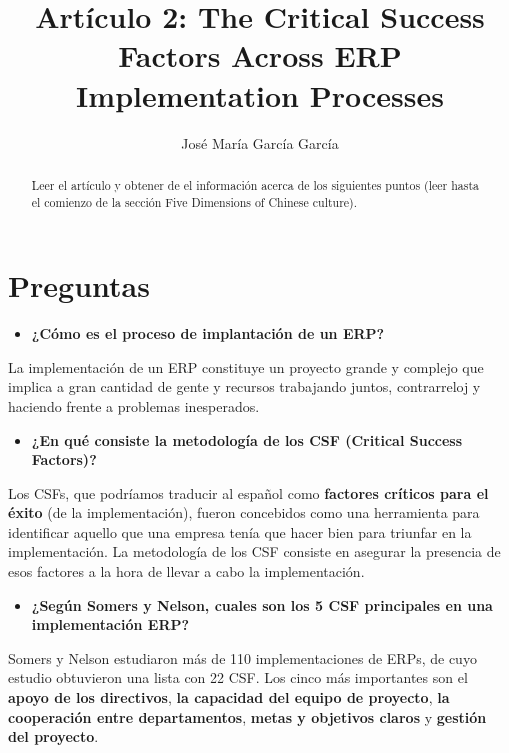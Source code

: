 \documentclass[11pt,a4paper]{article}
\author{José María García García}
\title{Artículo 2: The Critical Success Factors Across ERP Implementation Processes}
\begin{document}
\maketitle
\begin{abstract}
Leer el artículo y obtener de el información acerca de los siguientes puntos (leer hasta el comienzo de la sección Five Dimensions of Chinese culture).
\end{abstract}
%
%
\section{Preguntas}
\begin{itemize}
\item \textbf{¿Cómo es el proceso de implantación de un ERP?}
\end{itemize}
La implementación de un ERP constituye un proyecto grande y complejo que implica a gran cantidad de gente y recursos trabajando juntos, contrarreloj y haciendo frente a problemas inesperados. 

\begin{itemize}
\item \textbf{¿En qué consiste la metodología de los CSF (Critical Success Factors)?}
\end{itemize}
Los CSFs, que podríamos traducir al español como \textbf{factores críticos para el éxito} (de la implementación), fueron concebidos como una herramienta para identificar aquello que una empresa tenía que hacer bien para triunfar en la implementación. La metodología de los CSF consiste en asegurar la presencia de esos factores a la hora de llevar a cabo la implementación.

\begin{itemize}
\item \textbf{¿Según Somers y Nelson, cuales son los 5 CSF principales en una implementación ERP?}
\end{itemize}
Somers y Nelson estudiaron más de 110 implementaciones de ERPs, de cuyo estudio obtuvieron una lista con 22 CSF. Los cinco más importantes son el \textbf{apoyo de los directivos}, \textbf{la capacidad del equipo de proyecto}, \textbf{la cooperación entre departamentos}, \textbf{metas y objetivos claros} y  \textbf{gestión del proyecto}.
\end{document}
